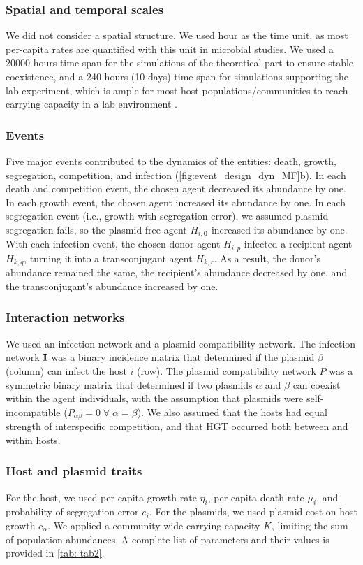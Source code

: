 \documentclass[10pt,letterpaper]{article}
\begin{document}
\subsubsection*{Spatial and temporal scales} We did not consider a spatial structure. We used hour as the time unit, as most per-capita rates are quantified with this unit in microbial studies. We used a 20000 hours time span for the simulations of the theoretical part to ensure stable coexistence, and a 240 hours (10 days) time span for simulations supporting the lab experiment, which is ample for most host populations/communities to reach carrying capacity in a lab environment \cite{Hall2016-zb}.

\subsubsection*{Events} Five major events contributed to the dynamics of the entities: death, growth, segregation, competition, and infection (\cref{fig:event_design_dyn_MF}b). In each death and competition event, the chosen agent decreased its abundance by one. In each growth event, the chosen agent increased its abundance by one. In each segregation event (i.e., growth with segregation error), we assumed plasmid segregation fails, so the plasmid-free agent $H_{i, \mathbf{0}}$ increased its abundance by one. With each infection event, the chosen donor agent $H_{i,p}$ infected a recipient agent $H_{k,q}$, turning it into a transconjugant agent $H_{k,r}$. As a result, the donor's abundance remained the same, the recipient's abundance decreased by one, and the transconjugant's abundance increased by one.


\subsubsection*{Interaction networks} We used an infection network and a plasmid compatibility network. The infection network $\vb{I}$ was a binary incidence matrix that determined if the plasmid $\beta$ (column) can infect the host $i$ (row). The plasmid compatibility network $P$ was a symmetric binary matrix that determined if two plasmids $\alpha$ and $\beta$ can coexist within the agent individuals, with the assumption that plasmids were self-incompatible ($P_{\alpha\beta}=0\;\forall\;\alpha = \beta$). We also assumed that the hosts had equal strength of interspecific competition, and that HGT occurred both between and within hosts.

\subsubsection*{Host and plasmid traits} For the host, we used per capita growth rate $\eta_i$, per capita death rate $\mu_i$, and probability of segregation error $e_i$. For the plasmids, we used plasmid cost on host growth $c_{\alpha}$. We applied a community-wide carrying capacity $K$, limiting the sum of population abundances. A complete list of parameters and their values is provided in \cref{tab: tab2}.
\end{document}
